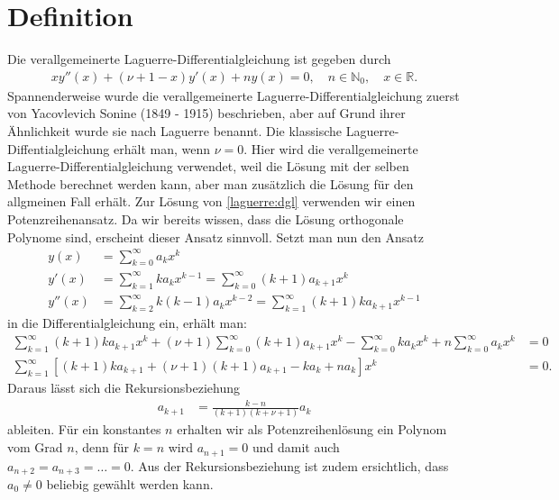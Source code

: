 %
%
%
\section{Definition
  \label{laguerre:section:definition}}
Die verallgemeinerte Laguerre-Differentialgleichung ist gegeben durch
\begin{align}
x y''(x) + (\nu + 1 - x) y'(x) + n y(x)
=
0
, \quad
n \in \mathbb{N}_0
, \quad
x \in \mathbb{R}
.
\label{laguerre:dgl}
\end{align}
Spannenderweise wurde die verallgemeinerte Laguerre-Differentialgleichung
zuerst von Yacovlevich Sonine (1849 - 1915) beschrieben,
aber auf Grund ihrer Ähnlichkeit wurde sie nach Laguerre benannt.
Die klassische Laguerre-Diffentialgleichung erhält man, wenn $\nu = 0$.
Hier wird die verallgemeinerte Laguerre-Differentialgleichung verwendet,
weil die Lösung mit der selben Methode berechnet werden kann,
aber man zusätzlich die Lösung für den allgmeinen Fall erhält.
Zur Lösung von \eqref{laguerre:dgl} verwenden wir einen
Potenzreihenansatz.
Da wir bereits wissen, dass die Lösung orthogonale Polynome sind,
erscheint dieser Ansatz sinnvoll.
Setzt man nun den Ansatz
\begin{align*}
y(x)
 & =
\sum_{k=0}^\infty a_k x^k
\\
y'(x)
 & =
\sum_{k=1}^\infty k a_k x^{k-1}
=
\sum_{k=0}^\infty (k+1) a_{k+1} x^k
\\
y''(x)
 & =
\sum_{k=2}^\infty k (k-1) a_k x^{k-2}
=
\sum_{k=1}^\infty (k+1) k a_{k+1} x^{k-1}
\end{align*}
in die Differentialgleichung ein, erhält man:
\begin{align*}
\sum_{k=1}^\infty (k+1) k a_{k+1} x^k
+
(\nu + 1)\sum_{k=0}^\infty (k+1) a_{k+1} x^k
-
\sum_{k=0}^\infty k a_k x^k
+
n \sum_{k=0}^\infty a_k x^k
 & =
0    \\
\sum_{k=1}^\infty
\left[ (k+1) k a_{k+1} + (\nu + 1)(k+1) a_{k+1} - k a_k + n a_k \right] x^k
 & =
0.
\end{align*}
Daraus lässt sich die Rekursionsbeziehung
\begin{align*}
a_{k+1}
 & =
\frac{k-n}{(k+1) (k + \nu + 1)} a_k
\end{align*}
ableiten.
Für ein konstantes $n$ erhalten wir als Potenzreihenlösung ein Polynom vom Grad
$n$,
denn für $k=n$ wird $a_{n+1} = 0$ und damit auch $a_{n+2}=a_{n+3}=\ldots=0$.
Aus der Rekursionsbeziehung ist zudem ersichtlich,
dass $a_0 \neq 0$ beliebig gewählt werden kann.
